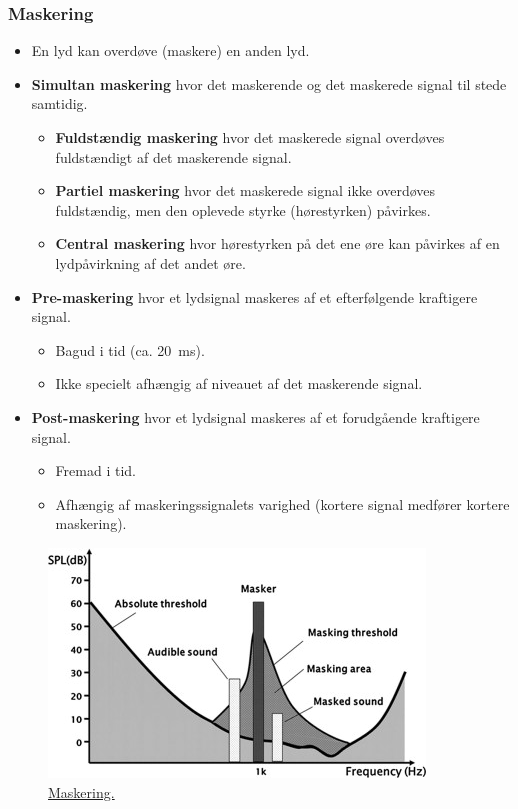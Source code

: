 \subsubsection{Maskering}
\begin{itemize}
	\item En lyd kan overdøve (maskere) en anden lyd.
	\item \textbf{Simultan maskering} hvor det maskerende og det maskerede signal til stede samtidig.
	\begin{itemize}
		\item \textbf{Fuldstændig maskering} hvor det maskerede signal overdøves fuldstændigt af det maskerende signal. 
		\item \textbf{Partiel maskering} hvor det maskerede signal ikke overdøves fuldstændig, men den oplevede styrke (hørestyrken) påvirkes. 
		\item \textbf{Central maskering} hvor hørestyrken på det ene øre kan påvirkes af en lydpåvirkning af det andet øre.
	\end{itemize}
	\item \textbf{Pre-maskering} hvor et lydsignal maskeres af et efterfølgende kraftigere signal.
	\begin{itemize}
		\item Bagud i tid (ca. \SI{20}{\milli\second}).
		\item Ikke specielt afhængig af niveauet af det maskerende signal.
	\end{itemize}
	\newpage\item \textbf{Post-maskering} hvor et lydsignal maskeres af et forudgående kraftigere signal.
	\begin{itemize}
		\item Fremad i tid.
	 	\item Afhængig af maskeringssignalets varighed (kortere signal medfører kortere maskering). 
	\end{itemize}  
\end{itemize}
\begin{figure} [H]
	\centering
	\includegraphics[width=.8\linewidth]{graphics/43.png}
	\caption{ \href{https://www.sciencedirect.com/science/article/pii/S0167639313000642}{Maskering.}}
	\label{fig:43}
\end{figure}